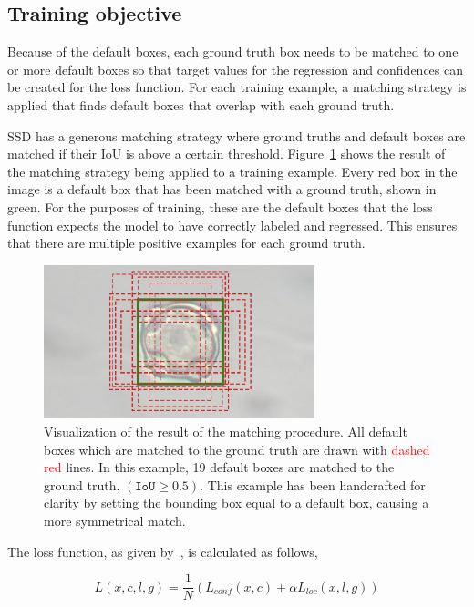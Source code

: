 \subsection{Training objective}
Because of the default boxes, each ground truth box needs to be matched to one or more default boxes so that target values for the regression and confidences can be created for the loss function.
For each training example, a matching strategy is applied that finds default boxes that overlap with each ground truth.

SSD has a generous matching strategy where ground truths and default boxes are matched if their IoU is above a certain threshold.
Figure~\ref{fig:priors} shows the result of the matching strategy being applied to a training example.
Every red box in the image is a default box that has been matched with a ground truth, shown in green.
For the purposes of training, these are the default boxes that the loss function expects the model to have correctly labeled and regressed.
This ensures that there are multiple positive examples for each ground truth.

\begin{figure}[htbp]
  \centering
  \includegraphics[width=0.7\textwidth]{figs/method/priors_matching.pdf}
  \caption[Default box matching]{Visualization of the result of the matching procedure.
  All default boxes which are matched to the \textcolor{nicegreen}{ground truth} are drawn with \textcolor{red}{dashed red} lines. In this example, 19 default boxes are matched to the ground truth. \((\texttt{IoU}\ge 0.5)\). This example has been handcrafted for clarity by setting the bounding box equal to a default box, causing a more symmetrical match.
}\label{fig:priors}
\end{figure}

The loss function, as given by\ \cite{liu_ssd_2016}, is calculated as follows,

\begin{equation}\label{eq:loss}
  L(x,c,l,g)=\frac{1}{N}\left( L_{conf}(x,c) + \alpha L_{loc}(x,l,g)\right)
\end{equation}

